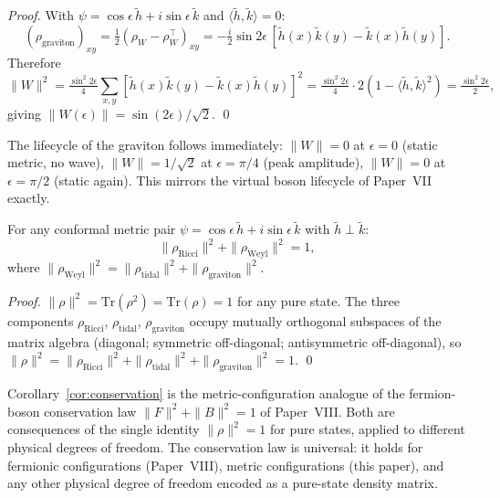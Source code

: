 \documentclass[11pt]{article}
\begin{document}
\begin{proof}
With $\psi = \cos\epsilon\,\tilde{h} + i\sin\epsilon\,\tilde{k}$
and $\langle\tilde{h},\tilde{k}\rangle = 0$:
\[
  (\rho_{\mathrm{graviton}})_{xy}
  = \tfrac{1}{2}(\rho_W - \rho_W^\top)_{xy}
  = -\tfrac{i}{2}\sin 2\epsilon\,
  [\tilde{h}(x)\tilde{k}(y) - \tilde{k}(x)\tilde{h}(y)].
\]
Therefore
\[
  \|W\|^2
  = \tfrac{\sin^2 2\epsilon}{4}
    \sum_{x,y}[\tilde{h}(x)\tilde{k}(y) - \tilde{k}(x)\tilde{h}(y)]^2
  = \tfrac{\sin^2 2\epsilon}{4}\cdot
    2(1 - \langle\tilde{h},\tilde{k}\rangle^2)
  = \tfrac{\sin^2 2\epsilon}{2},
\]
giving $\|W(\epsilon)\| = \sin(2\epsilon)/\sqrt{2}$. \qed
\end{proof}

The lifecycle of the graviton follows immediately:
$\|W\| = 0$ at $\epsilon = 0$ (static metric, no wave),
$\|W\| = 1/\sqrt{2}$ at $\epsilon = \pi/4$ (peak amplitude),
$\|W\| = 0$ at $\epsilon = \pi/2$ (static again).
This mirrors the virtual boson lifecycle of Paper~VII exactly.

\begin{corollary}
\label{cor:conservation}
For any conformal metric pair $\psi = \cos\epsilon\,\tilde{h}
+ i\sin\epsilon\,\tilde{k}$ with $\tilde{h} \perp \tilde{k}$:
\[
  \|\rho_{\mathrm{Ricci}}\|^2 + \|\rho_{\mathrm{Weyl}}\|^2 = 1,
\]
where $\|\rho_{\mathrm{Weyl}}\|^2 = \|\rho_{\mathrm{tidal}}\|^2
+ \|\rho_{\mathrm{graviton}}\|^2$.
\end{corollary}

\begin{proof}
$\|\rho\|^2 = \mathrm{Tr}(\rho^2) = \mathrm{Tr}(\rho) = 1$ for any
pure state.
The three components $\rho_{\mathrm{Ricci}}$, $\rho_{\mathrm{tidal}}$,
$\rho_{\mathrm{graviton}}$ occupy mutually orthogonal subspaces of the
matrix algebra (diagonal; symmetric off-diagonal; antisymmetric
off-diagonal), so $\|\rho\|^2 = \|\rho_{\mathrm{Ricci}}\|^2 +
\|\rho_{\mathrm{tidal}}\|^2 + \|\rho_{\mathrm{graviton}}\|^2 = 1$.
\qed
\end{proof}

\begin{remark}
Corollary~\ref{cor:conservation} is the metric-configuration analogue
of the fermion-boson conservation law $\|F\|^2 + \|B\|^2 = 1$ of
Paper~VIII.
Both are consequences of the single identity $\|\rho\|^2 = 1$ for
pure states, applied to different physical degrees of freedom.
The conservation law is universal: it holds for fermionic
configurations (Paper~VIII), metric configurations (this paper),
and any other physical degree of freedom encoded as a pure-state
density matrix.
\end{remark}
\end{document}
